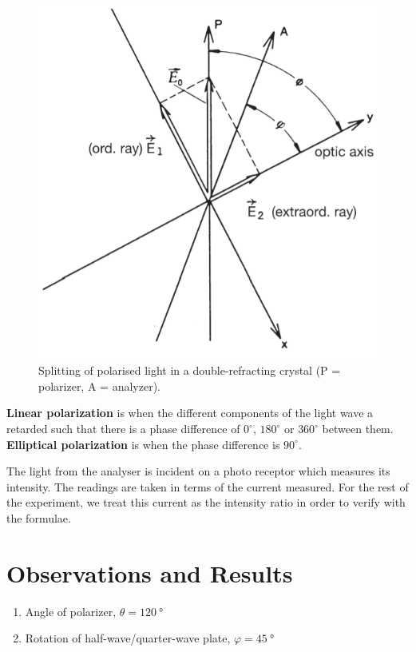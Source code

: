 \documentclass{article}
\begin{document}
\begin{figure}
    \centering
    \includegraphics[scale = 0.5]{Figures/splitpolar.png}
    \caption{Splitting of polarised light in a double-refracting crystal (P = polarizer, A = analyzer).}
    \label{fig:my_label}
\end{figure}
\textbf{Linear polarization} is when the different components of the light wave a retarded such that there is a phase difference of $0^\circ$, $180^\circ$ or $360^\circ$ between them. \textbf{Elliptical polarization} is when the phase difference is $90^\circ$.
\par
The light from the analyser is incident on a photo receptor which measures its intensity. The readings are taken in terms of the current measured. For the rest of the experiment, we treat this current as the intensity ratio in order to verify with the formulae.





\section{Observations and Results}
\begin{enumerate}
    \item Angle of polarizer, $\theta = \SI{120}{\degree}$
    \item Rotation of half-wave/quarter-wave plate, $\varphi = \SI{45}{\degree}$
\end{enumerate}
\end{document}

